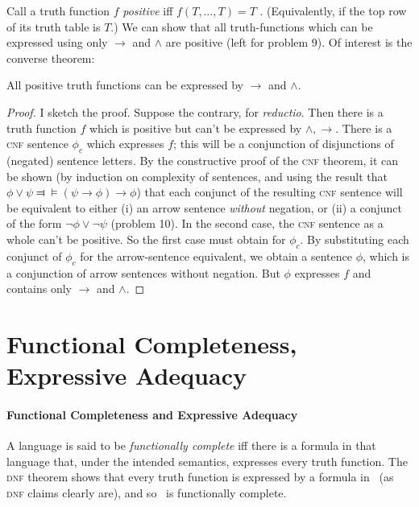 Call a truth function $f$ \emph{positive}  iff $f(T,\ldots,T)=T$ \citep[exercise 2.9.3]{bosintlo}. (Equivalently, if the top row of its truth table is $T$.) We can show that  all truth-functions which can be expressed using only $\to$ and $\wedge$ are positive (left for problem 9). Of interest is the converse theorem: \begin{theorem}
	All positive truth functions can be expressed by $\to$ and $\wedge$. \label{positive} \begin{proof}
	I sketch the proof.	Suppose the contrary, for \emph{reductio}. Then there is a truth function $f$ which is positive but can't be expressed by $\wedge,\to$. There is a \textsc{\lowercase{CNF}} sentence $\phi_{c}$ which expresses $f$; this will be a conjunction of disjunctions of (negated) sentence letters. By the constructive proof of the \textsc{\lowercase{CNF}} theorem, it can be shown (by induction on complexity of sentences, and using the result that $\phi\vee \psi\Dashv\vDash (\psi \to \phi)\to \phi$) that each conjunct of the resulting \textsc{\lowercase{CNF}} sentence will be equivalent to either (i) an arrow sentence \emph{without} negation, or (ii)  a conjunct  of the form $\neg \phi \vee \neg \psi$ (problem 10). In the second case, the \textsc{\lowercase{CNF}} sentence as a whole can't be positive. So the first case must obtain for $\phi_{c}$. By substituting each conjunct of $\phi_{c}$ for the arrow-sentence equivalent, we obtain a sentence $\phi$, which is a conjunction of arrow sentences without negation. But $\phi$ expresses $f$ and contains only $\to$ and $\wedge$.
	\end{proof}
\end{theorem} 




\section{Functional Completeness, Expressive Adequacy}
\paragraph{Functional Completeness and Expressive Adequacy}

A language is said to be \emph{functionally complete} iff there is a formula in that language that, under the intended semantics, expresses every truth function. The \textsc{\lowercase{DNF}} theorem shows that every truth function is expressed by a formula in \lone\ (as \textsc{\lowercase{DNF}} claims clearly are), and so \lone\ is functionally complete.

